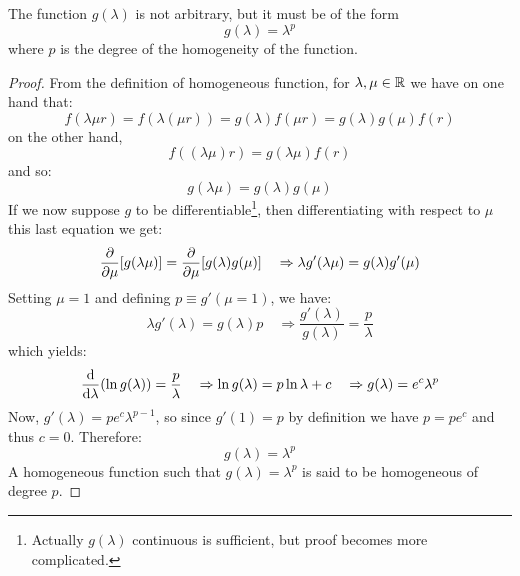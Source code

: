\documentclass[../main/main.tex]{subfiles}
\begin{document}
\begin{theorem}{}{}
  The function \( g(\lambda ) \) is not arbitrary, but it must be of the form
\begin{equation}
  g(\lambda ) = \lambda ^p
\end{equation}
where \( p \) is the degree of the homogeneity of the function.
\end{theorem}

\begin{proof}
  From the definition of homogeneous function, for \( \lambda, \mu \in \mathbb{R}  \) we have on one hand that:
\begin{equation*}
  f(\lambda \mu r) = f(\lambda (\mu r)) = g (\lambda ) f(\mu r) = g(\lambda ) g(\mu ) f(r)
\end{equation*}
on the other hand,
\begin{equation*}
  f((\lambda \mu )r) = g (\lambda  \mu ) f(r)
\end{equation*}
and so:
\begin{equation*}
  g (\lambda \mu ) = g(\lambda ) g (\mu )
\end{equation*}
If we now suppose \( g \) to be differentiable\footnote{Actually \( g(\lambda ) \) continuous is sufficient, but proof becomes more complicated.}, then differentiating with respect to \( \mu  \)  this last equation we get:
\begin{equation*}
  \pdv{}{\mu } \qty[g(\lambda \mu )] = \pdv{}{\mu } \qty[ g(\lambda )g(\mu  )] \quad
  \Rightarrow \lambda g' (\lambda \mu ) = g (\lambda ) g' (\mu )
\end{equation*}
Setting \( \mu =1 \) and defining \( p \equiv g'( \mu =1 ) \), we have:
\begin{equation*}
   \lambda g'(\lambda ) = g(\lambda ) p \quad \Rightarrow \frac{g'(\lambda )}{g(\lambda )} = \frac{p}{\lambda }
\end{equation*}
which yields:
\begin{equation*}
  \dv{}{\lambda } \qty(\ln{g(\lambda )} ) = \frac{p}{\lambda }   \quad \Rightarrow \ln{g(\lambda )} = p \ln{\lambda } + c \quad \Rightarrow g (\lambda ) = e^c \lambda ^p
\end{equation*}
Now, \( g'(\lambda ) = p e^c \lambda ^{p-1} \), so since \( g'(1) = p \) by definition we have  \( p = p e^c \) and thus \( c=0 \).
Therefore:
\begin{equation*}
  g(\lambda ) = \lambda ^ p
\end{equation*}
A homogeneous function such that \(   g(\lambda ) = \lambda ^ p \)  is said to be homogeneous of degree \( p \).
\end{proof}
\end{document}
